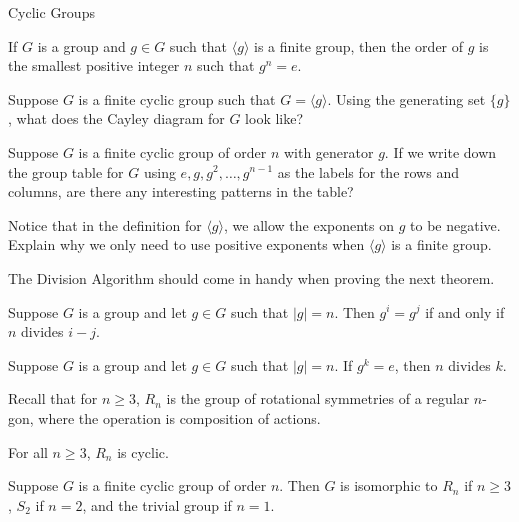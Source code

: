 \begin{section}{Cyclic Groups}
\begin{corollary}\label{cor:order_smallest_exponent}
If $G$ is a group and $g\in G$ such that $\langle g\rangle$ is a finite group, then the order of $g$ is the smallest positive integer $n$ such that $g^n=e$.
\end{corollary}

\begin{problem}\label{prob:Cayley_cyclic}
Suppose $G$ is a finite cyclic group such that $G=\langle g\rangle$. Using the generating set $\{g\}$, what does the Cayley diagram for $G$ look like?
\end{problem}

\begin{problem}
Suppose $G$ is a finite cyclic group of order $n$ with generator $g$.  If we write down the group table for $G$ using $e, g, g^2, \ldots, g^{n-1}$ as the labels for the rows and columns, are there any interesting patterns in the table?
\end{problem}

\begin{problem}\label{prob:finite_pos_exps}
Notice that in the definition for $\langle g\rangle$, we allow the exponents on $g$ to be negative.  Explain why we only need to use positive exponents when $\langle g\rangle$ is a finite group.
\end{problem}

The Division Algorithm should come in handy when proving the next theorem.

\begin{theorem}\label{thm:criterion_on_powers}
Suppose $G$ is a group and let $g\in G$ such that $|g|=n$.  Then $g^i=g^j$ if and only if $n$ divides $i-j$.
\end{theorem}

\begin{corollary}
Suppose $G$ is a group and let $g\in G$ such that $|g|=n$.  If $g^k=e$, then $n$ divides $k$.
\end{corollary}

Recall that for $n\geq3$, $R_n$ is the group of rotational symmetries of a regular $n$-gon, where the operation is composition of actions.

\begin{theorem}
For all $n\geq 3$, $R_n$ is cyclic.
\end{theorem}

\begin{theorem}\label{thm:finite_cyclic_groups}
Suppose $G$ is a finite cyclic group of order $n$.  Then $G$ is isomorphic to $R_n$ if $n\geq 3$, $S_2$ if $n=2$, and the trivial group if $n=1$.
\end{theorem}


\end{section}
